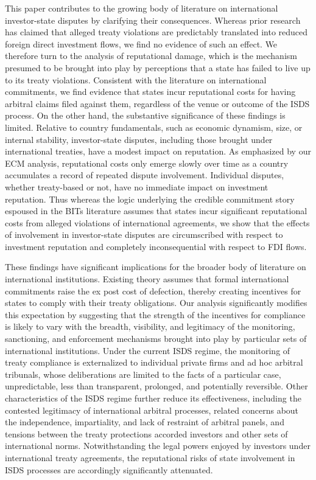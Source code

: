 \documentclass[12pt,onesided]{amsart}
\begin{document}
This paper contributes to the growing body of literature on international investor-state disputes by clarifying their consequences. Whereas prior research has claimed that alleged treaty violations are predictably translated into reduced foreign direct investment flows, we find no evidence of such an effect. We therefore turn to the analysis of reputational damage, which is the mechanism presumed to be brought into play by perceptions that a state has failed to live up to its treaty violations. Consistent with the literature on international commitments, we find evidence that states incur reputational costs for having arbitral claims filed against them, regardless of the venue or outcome of the ISDS process. On the other hand, the substantive significance of these findings is limited. Relative to country fundamentals, such as economic dynamism, size, or internal stability, investor-state disputes, including those brought under international treaties, have a modest impact on reputation. As emphasized by our ECM analysis, reputational costs only emerge slowly over time as a country accumulates a record of repeated dispute involvement. Individual disputes, whether treaty-based or not, have no immediate  impact on investment reputation. Thus whereas the logic underlying the credible commitment story espoused in the BITs literature assumes that states incur significant reputational costs from alleged violations of international agreements, we show that the effects of involvement in investor-state disputes are circumscribed with respect to investment reputation and completely inconsequential with respect to FDI flows.

These findings have significant implications for the broader body of literature on international institutions. Existing theory assumes that formal international commitments raise the ex post cost of defection, thereby creating incentives for states to comply with their treaty obligations. Our analysis significantly modifies this expectation by suggesting that the strength of the incentives for compliance is likely to vary with the breadth, visibility, and legitimacy of the monitoring, sanctioning, and enforcement mechanisms brought into play by particular sets of international institutions. Under the current ISDS regime, the monitoring of treaty compliance is externalized to individual private firms and ad hoc arbitral tribunals, whose deliberations are limited to the facts of a particular case, unpredictable, less than transparent, prolonged, and potentially reversible. Other characteristics of the ISDS regime further reduce its effectiveness, including the contested legitimacy of international arbitral processes,  related concerns about the independence, impartiality, and lack of restraint of arbitral panels, and  tensions between the treaty protections accorded investors and other sets of international norms. Notwithstanding the legal powers enjoyed by investors under international treaty agreements, the reputational risks of state involvement in ISDS processes are accordingly significantly attenuated. 
\end{document}
